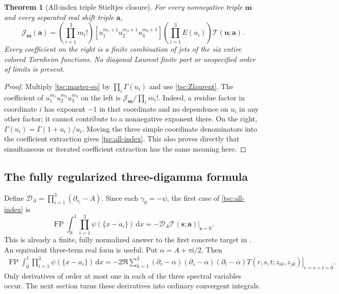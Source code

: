 \documentclass[11pt]{article}
\numberwithin{equation}{section}
\newtheorem{theorem}{Theorem}[section]
\theoremstyle{definition}\newtheorem{definition}[theorem]{Definition}
\theoremstyle{remark}\newtheorem{remark}[theorem]{Remark}
\DeclareMathOperator{\FP}{FP}
\newcommand{\ii}{\mathrm i}
\newcommand{\dd}{\,\mathrm d}
\newcommand{\calJ}{\mathcal J}
\newcommand{\calT}{\mathcal T}
\begin{document}
\begin{theorem}[All-index triple Stieltjes closure]\label{tsc:stieltjes-triple}
For every nonnegative triple $\mathbf m$ and every separated real shift
triple $\mathbf a$,
\begin{equation}\label{tsc:all-index}
 \boxed{\displaystyle
 \calJ_{\mathbf m}(\mathbf a)=
  \left(\prod_{i=1}^3m_i!\right)
  [u_1^{m_1+1}u_2^{m_2+1}u_3^{m_3+1}]
       \left(\prod_{i=1}^3E(u_i)\right)\calT(\mathbf u;\mathbf a).}
\end{equation}
Every coefficient on the right is a finite combination of jets of the six
entire colored Tornheim functions. No diagonal Laurent finite part or
unspecified order of limits is present.
\end{theorem}
\begin{proof}
Multiply \eqref{tsc:master-eq} by $\prod_i\Gamma(u_i)$ and use
\eqref{tsc:Zlaurent}. The coefficient of
$u_1^{m_1}u_2^{m_2}u_3^{m_3}$ on the left is
$\calJ_{\mathbf m}/\prod_i m_i!$. Indeed, a residue factor in coordinate
$i$ has exponent $-1$ in that coordinate and no dependence on $u_i$ in
any other factor; it cannot contribute to a nonnegative exponent there.
On the right, $\Gamma(u_i)=\Gamma(1+u_i)/u_i$. Moving the three simple
coordinate denominators into the coefficient extraction gives
\eqref{tsc:all-index}. This also proves directly that simultaneous or
iterated coefficient extraction has the same meaning here.
\end{proof}

\subsection{The fully regularized three-digamma formula}
Define $\mathscr D_A=\prod_{i=1}^3(\partial_{s_i}-A)$. Since each
$\gamma_0=-\psi$, the first case of \eqref{tsc:all-index} is
\begin{equation}\label{tsc:digamma-operator}
 \FP\int_0^1\prod_{i=1}^3\psi(\{x-a_i\})\dd x
       =-\left.\mathscr D_A\calT(\mathbf s;\mathbf a)\right|_{\mathbf s=0}.
\end{equation}
This is already a finite, fully normalized answer to the first concrete
target in \cite{tsc:shj}. An equivalent three-term real form is useful.
Put $\alpha=A+\pi\ii/2$. Then
\begin{align}\label{tsc:digamma-three}
 \FP\int_0^1\prod_{i=1}^3\psi(\{x-a_i\})\dd x
 =-2\Re\sum_{k=1}^3
 \left.(\partial_r-\alpha)(\partial_s-\alpha)
       (\partial_t-\overline\alpha)
       T(r,s,t;z_{ik},z_{jk})\right|_{r=s=t=0}.
\end{align}
Only derivatives of order at most one in each of the three spectral
variables occur. The next section turns these derivatives into ordinary
convergent integrals.
\end{document}
